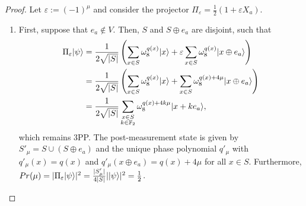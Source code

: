 \begin{proof}
Let $\varepsilon := (-1)^\mu$ and consider the projector $\Pi_\varepsilon = \frac{1}{2}(1 + \varepsilon X_a)$.

\begin{enumerate}

\item
First, suppose that $e_a \not\in V$.
Then, $S$ and $S \oplus e_a$ are disjoint, such that
\begin{align}
    \Pi_\varepsilon |\psi\rangle
    &= \frac{1}{2\sqrt{|S|}} \left( \sum_{x\in S} \omega_8^{q(x)}|x\rangle + \varepsilon\sum_{x\in S} \omega_8^{q(x)}|x \oplus e_a\rangle \right) \\
    &= \frac{1}{2\sqrt{|S|}} \left( \sum_{x\in S} \omega_8^{q(x)}|x\rangle + \sum_{x\in S} \omega_8^{q(x) + 4\mu}|x \oplus e_a\rangle \right) \\
    &= \frac{1}{2\sqrt{|S|}} \sum_{\substack{x\in S\\ k \in\mathbb F_2}} \omega_8^{q(x) + 4k\mu} |x + ke_a\rangle,
\end{align}
which remains 3PP.
The post-measurement state is given by $S'_\mu = S \cup (S \oplus e_a)$ and the unique phase polynomial $q'_\mu$ with $q'_\mu(x) = q(x)$ and $q'_\mu(x \oplus e_a) = q(x) + 4\mu$ for all $x \in S$.
Furthermore, $Pr(\mu) = |\Pi_\varepsilon|\psi\rangle|^2 = \frac{|S'_\mu|}{4|S|}||\psi\rangle|^2 = \frac{1}{2}$.


\end{enumerate}
\end{proof}
